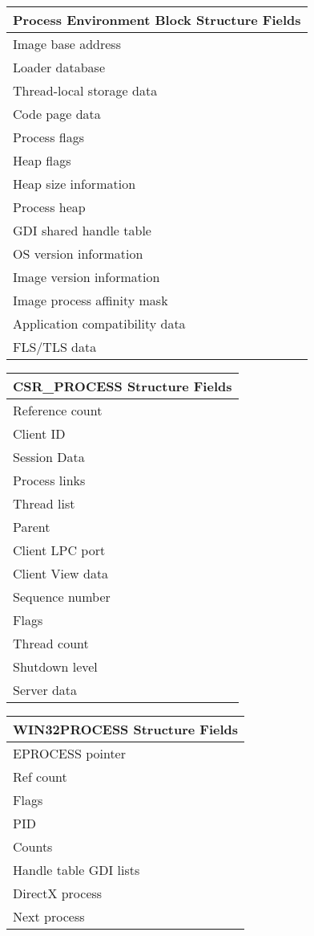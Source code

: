 \documentclass[10pt,conference,draftclsnofoot,onecolumn]{IEEEtran}
\begin{document}
\begin{appendices}
\begin{tabular}{|l|}
\textbf{Process Environment Block Structure Fields}\\
\hline
Image base address \\
Loader database \\
Thread-local storage data \\
Code page data \\
Process flags \\
Heap flags \\
Heap size information \\
Process heap \\
GDI shared handle table \\
OS version information \\
Image version information \\
Image process affinity mask \\
Application compatibility data \\
FLS/TLS data \\
\end{tabular}


\begin{tabular}{|l|}
\textbf{CSR\_PROCESS Structure Fields}\\
\hline
Reference count \\
Client ID \\
Session Data \\
Process links \\
Thread list \\
Parent \\
Client LPC port \\
Client View data \\
Sequence number \\
Flags \\
Thread count \\
Shutdown level \\
Server data \\
\end{tabular}

\begin{tabular}{|l|}
\textbf{WIN32PROCESS Structure Fields}\\
\hline
EPROCESS pointer\\
Ref count \\
Flags \\
PID \\
Counts \\
Handle table GDI lists \\
DirectX process \\
Next process \\
\end{tabular}

\end{appendices}
\end{document}
